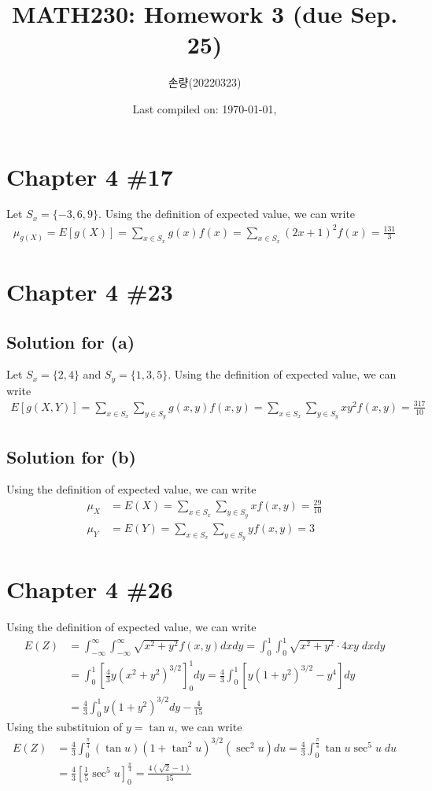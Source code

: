 \documentclass{scrartcl}
\title{MATH230: Homework 3 (due Sep. 25)}
\author{손량(20220323)}
\date{Last compiled on: \today, \currenttime}
\begin{document}
\maketitle

\section{Chapter 4 \#17}
Let \(S_x = \{-3, 6, 9\}\). Using the definition of expected value, we can
write
\begin{align*}
  \mu_{g(X)} = E[g(X)] = \sum_{x \in S_x} g(x) f(x)
  = \sum_{x \in S_x} (2x + 1)^2 f(x) = \frac{131}{3}
\end{align*}

\section{Chapter 4 \#23}
\subsection{Solution for (a)}
Let \(S_x = \{2, 4\}\) and \(S_y = \{1, 3, 5\}\). Using the definition of
expected value, we can write
\begin{align*}
  E[g(X, Y)] = \sum_{x \in S_x} \sum_{y \in S_y} g(x, y) f(x, y)
  = \sum_{x \in S_x} \sum_{y \in S_y} xy^2 f(x, y) = \frac{317}{10}
\end{align*}

\subsection{Solution for (b)}
Using the definition of expected value, we can write
\begin{align*}
  \mu_X &= E(X) = \sum_{x \in S_x} \sum_{y \in S_y} x f(x, y)
  = \frac{29}{10} \\
  \mu_Y &= E(Y) = \sum_{x \in S_x} \sum_{y \in S_y} y f(x, y) = 3
\end{align*}

\section{Chapter 4 \#26}
Using the definition of expected value, we can write
\begin{align*}
  E(Z)
  &= \int^\infty_{-\infty} \int^\infty_{-\infty} \sqrt{x^2 + y^2} f(x, y) dx dy
  = \int^1_0 \int^1_0 \sqrt{x^2 + y^2} \cdot 4xy\; dx dy \\
  &= \int^1_0 \left[ \frac{4}{3} y (x^2 + y^2)^{3/2} \right]^1_0 dy
  = \frac{4}{3} \int^1_0 \left[ y(1 + y^2)^{3 / 2} - y^4 \right] dy \\
  &= \frac{4}{3} \int^1_0 y(1 + y^2)^{3 / 2} dy - \frac{4}{15}
\end{align*}
Using the substituion of \(y = \tan u\), we can write
\begin{align*}
  E(Z)
  &= \frac{4}{3}
  \int^\frac{\pi}{4}_0 (\tan u) (1 + \tan^2 u)^{3 / 2} (\sec^2 u) du
  = \frac{4}{3} \int^\frac{\pi}{4}_0 \tan u \sec^5 u\; du \\
  &= \frac{4}{3} \left[ \frac{1}{5} \sec^5 u \right]^\frac{\pi}{4}_0
  = \frac{4(\sqrt{2} - 1)}{15}
\end{align*}
\end{document}
